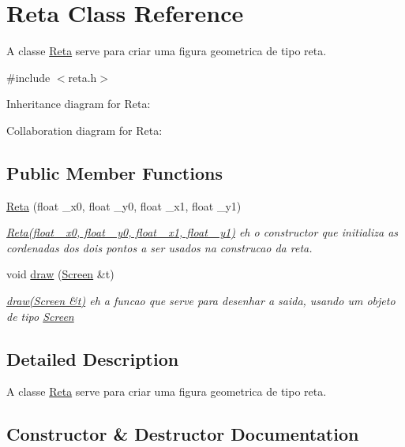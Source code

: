 \hypertarget{classReta}{}\section{Reta Class Reference}
\label{classReta}


A classe \hyperlink{classReta}{Reta} serve para criar uma figura geometrica de tipo reta.  




{\ttfamily \#include $<$reta.\+h$>$}



Inheritance diagram for Reta\+:


Collaboration diagram for Reta\+:
\subsection*{Public Member Functions}
\begin{DoxyCompactItemize}
\item 
\hyperlink{classReta_a9cde511ceb1d4e6638aaf735dfc24a7c}{Reta} (float \+\_\+x0, float \+\_\+y0, float \+\_\+x1, float \+\_\+y1)
\begin{DoxyCompactList}\small\item\em \hyperlink{classReta_a9cde511ceb1d4e6638aaf735dfc24a7c}{Reta(float \+\_\+x0, float \+\_\+y0, float \+\_\+x1, float \+\_\+y1)} eh o constructor que initializa as cordenadas dos dois pontos a ser usados na construcao da reta. \end{DoxyCompactList}\item 
void \hyperlink{classReta_ac2e9805183cd474b62bffd8b032cd780}{draw} (\hyperlink{classScreen}{Screen} \&t)
\begin{DoxyCompactList}\small\item\em \hyperlink{classReta_ac2e9805183cd474b62bffd8b032cd780}{draw(\+Screen \&t)} eh a funcao que serve para desenhar a saida, usando um objeto de tipo \hyperlink{classScreen}{Screen} \end{DoxyCompactList}\end{DoxyCompactItemize}


\subsection{Detailed Description}
A classe \hyperlink{classReta}{Reta} serve para criar uma figura geometrica de tipo reta. 

\subsection{Constructor \& Destructor Documentation}
\mbox{\label{classReta_a9cde511ceb1d4e6638aaf735dfc24a7c}} 
